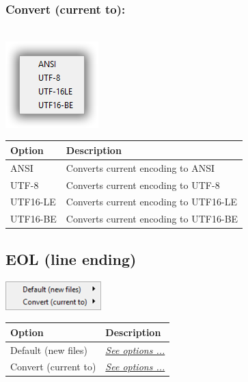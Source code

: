 \hypertarget{menu_format_encoding_convert}{}
\subsubsection{Convert (current to):}\\

\includegraphics[scale=0.50]{./res/encoding.png}\\

\begin{scriptsize}
  \begin{tabularx}{\textwidth}{>{\hsize=0.3\hsize}X>{\hsize=0.7\hsize}X}\\
    \hline
    \textbf{Option} & \textbf{Description} \\
    \hline
    ANSI & Converts current encoding to ANSI \\
    UTF-8 & Converts current encoding to UTF-8 \\
    UTF16-LE & Converts current encoding to UTF16-LE \\
    UTF16-BE & Converts current encoding to UTF16-BE \\
    \hline
  \end{tabularx}
\end{scriptsize}


\hypertarget{menu_format_eol}{}
\subsection{EOL (line ending)}

\includegraphics[scale=0.50]{./res/menu_format_eol.png}\\

\begin{scriptsize}
  \begin{tabularx}{\textwidth}{>{\hsize=0.4\hsize}X>{\hsize=0.6\hsize}X}\\
    \hline
    \textbf{Option} & \textbf{Description} \\
    \hline
    Default (new files) & \textit{\href{\#menu\_format\_eol\_default}{See options ...}} \\
    Convert (current to) & \textit{\href{\#menu\_format\_eol\_convert}{See options ...}} \\
    \hline
  \end{tabularx}
\end{scriptsize}


